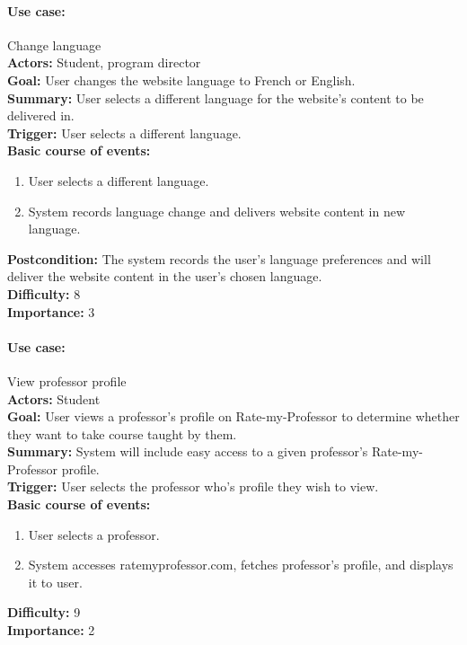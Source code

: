\documentclass[12pt]{article}
\begin{document}
\paragraph*{Use case:} Change language\\
\textbf{Actors:} Student, program director\\
\textbf{Goal:} User changes the website language to French or English.\\
\textbf{Summary:} User selects a different language for the website's content to be delivered in.\\
\textbf{Trigger:} User selects a different language.\\
\textbf{Basic course of events:}
\begin{enumerate}
\item User selects a different language.
\item System records language change and delivers website content in new language.
\end{enumerate}
\textbf{Postcondition:} The system records the user's language preferences and will deliver the website content in the user's chosen language.\\
\textbf{Difficulty:} 8\\
\textbf{Importance:} 3\\


\paragraph*{Use case:} View professor profile\\
\textbf{Actors:} Student\\
\textbf{Goal:} User views a professor's profile on Rate-my-Professor to determine whether they want to take course taught by them.\\
\textbf{Summary:} System will include easy access to a given professor's Rate-my-Professor profile.\\
\textbf{Trigger:} User selects the professor who's profile they wish to view.\\
\textbf{Basic course of events:}
\begin{enumerate}
\item User selects a professor.
\item System accesses ratemyprofessor.com, fetches professor's profile, and displays it to user.
\end{enumerate}
\textbf{Difficulty:} 9\\
\textbf{Importance:} 2\\
\end{document}
